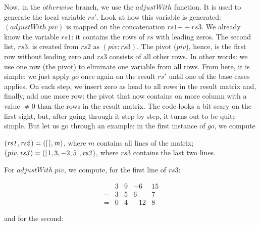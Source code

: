\documentclass[tikz]{scrreprt}
\newcommand{\Varid}[1]{\mathit{#1}}
\newcommand{\plus}{\mathbin{+\!\!\!+}}
\begin{document}
Now, in the \ensuremath{\Varid{otherwise}} branch, we use the \ensuremath{\Varid{adjustWith}} function.
It is used to generate the local variable \ensuremath{\Varid{rs'}}. Look at how
this variable is generated: \ensuremath{(\Varid{adjustWith}\;\Varid{piv})} is mapped on 
the concatenation \ensuremath{\Varid{rs1}\plus \Varid{rs3}}. We already know the variable
\ensuremath{\Varid{rs1}}: it contains the rows of \ensuremath{\Varid{rs}} with leading zeros.
The second list, \ensuremath{\Varid{rs3}}, is created from \ensuremath{\Varid{rs2}} as \ensuremath{(\Varid{piv}\mathbin{:}\Varid{rs3})}.
The pivot (\ensuremath{\Varid{piv}}), hence, is the first row without leading zero
and \ensuremath{\Varid{rs3}} consists of all other rows.
In other words: we use one row (the pivot) to eliminate
one variable from all rows.
From here, it is simple: we just apply \ensuremath{\Varid{go}} 
once again on the result \ensuremath{\Varid{rs'}}
until one of the base cases applies. On each step,
we insert zero as head to all rows in the result matrix 
and, finally, add one more row: the pivot that now contains
on more column with a value $\neq 0$ than the rows in
the result matrix. The code looks a bit scary on the first sight,
but, after going through it step by step, 
it turns out to be quite simple.
But let us go through an example:
in the first instance of \ensuremath{\Varid{go}}, we compute

\begin{minipage}{\textwidth}
\ensuremath{(\Varid{rs1},\Varid{rs2})\mathrel{=}([\mskip1.5mu \mskip1.5mu],\Varid{m})}, where $m$ contains all lines of the matrix;\\
\ensuremath{(\Varid{piv},\Varid{rs3})\mathrel{=}([\mskip1.5mu \mathrm{1},\mathrm{3},\mathbin{-}\mathrm{2},\mathrm{5}\mskip1.5mu],\Varid{rs3})}, where \ensuremath{\Varid{rs3}} contains the last two lines.
\end{minipage}

For \ensuremath{\Varid{adjustWith}\;\Varid{piv}}, we compute, for the first line of \ensuremath{\Varid{rs3}}:

\begin{equation}
\begin{array}{crrrr}
  &  3 & 9 & -6  & 15\\
- &  3 & 5 &  6  &  7\\
= &  0 & 4 & -12 &  8
\end{array}
\end{equation}

and for the second:
\end{document}
